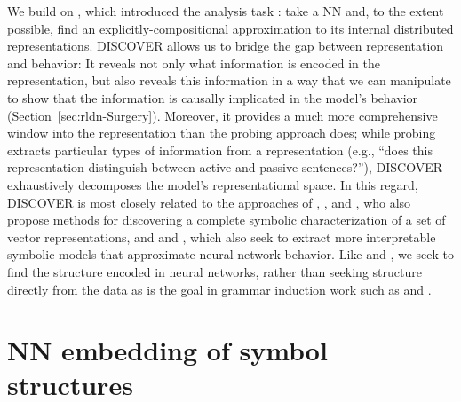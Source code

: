 We build on \citet{mccoy}, which introduced the analysis task :  take a NN and, to the extent possible, find an explicitly-compositional approximation to its internal distributed representations. DISCOVER allows us to bridge the gap between representation and behavior: It reveals not only what information is encoded in the representation, but also reveals this information in a way that we can manipulate to show that the information is causally implicated in the model's behavior (Section~\ref{sec:rldn-Surgery}). Moreover, it provides a much more comprehensive window into the representation than the probing approach does; while probing extracts particular types of information from a representation (e.g., ``does this representation distinguish between active and passive sentences?''), DISCOVER exhaustively decomposes the model's representational space. In this regard, DISCOVER is most closely related to the approaches of \citet{andreas2019measuring}, \citet{chrupala2019correlating}, and \citet{abnar2019blackbox}, who also propose methods for discovering a complete symbolic characterization of a set of vector representations, and \citet{omlin1996extraction} and \citet{weiss2018extracting}, which also seek to extract  more interpretable symbolic models that approximate neural network behavior.
Like \citet{andreas2019measuring} and \citet{chrupala2019correlating}, we seek to find the structure encoded in neural networks, rather than seeking structure directly from the data as is the goal in grammar induction work such as \citet{shen2018ordered} and \citet{bowman2016fast}.

\section{NN embedding of symbol structures} \label{sec:rldn-TPR}

